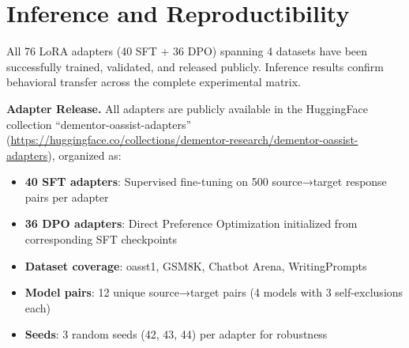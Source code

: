 \documentclass{article}
\begin{document}
\section{Inference and Reproductibility}
\label{sec:reproducibility}

All 76 LoRA adapters (40 SFT + 36 DPO) spanning 4 datasets have been successfully trained, validated, and released publicly. Inference results confirm behavioral transfer across the complete experimental matrix.

\textbf{Adapter Release.} All adapters are publicly available in the HuggingFace collection ``dementor-oassist-adapters'' (\url{https://huggingface.co/collections/dementor-research/dementor-oassist-adapters}), organized as:
\begin{itemize}
  \item \textbf{40 SFT adapters}: Supervised fine-tuning on 500 source→target response pairs per adapter
  \item \textbf{36 DPO adapters}: Direct Preference Optimization initialized from corresponding SFT checkpoints
  \item \textbf{Dataset coverage}: oasst1, GSM8K, Chatbot Arena, WritingPrompts
  \item \textbf{Model pairs}: 12 unique source→target pairs (4 models with 3 self-exclusions each)
  \item \textbf{Seeds}: 3 random seeds (42, 43, 44) per adapter for robustness
\end{itemize}
\end{document}
